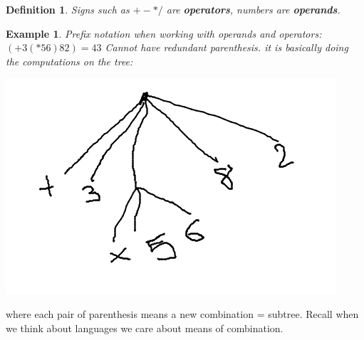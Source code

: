 \documentclass[a4paper,twoside]{article}
\newtheorem{example}[theorem]{Example}
\newtheorem{definition}[theorem]{Definition}
\numberwithin{equation}{section}
\begin{document}
\begin{definition}
    Signs such as $+ -  * /$ are \textbf{operators}, numbers are \textbf{operands}.
\end{definition}
\begin{example}
    Prefix notation when working with operands and operators: $(+ 3 (* 5 6) 8 2) = 43$ Cannot have
    redundant parenthesis. it is basically doing the computations on the tree:
\end{example}
\begin{center}
    \includegraphics[scale=0.5]{assets/prefix_notation.jpg}
\end{center}
where each pair of parenthesis means a new combination = subtree. Recall when we think about languages we care about means of combination.
\end{document}
